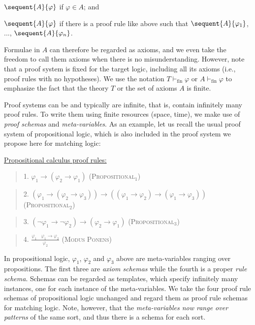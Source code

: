 \documentclass[UTF8,11pt]{article}
\theoremstyle{plain}
\theoremstyle{definition}
\theoremstyle{remark}
\newcommand{\vdashfin}{\vdash_\text{fin}}
\newcommand{\ra}{\rightarrow}
\begin{document}
$\sequent{A}{\varphi}$ if $\varphi \in A$; and

$\sequent{A}{\varphi}$ if there is a proof rule like above such that
$\sequent{A}{\varphi_1}$, ..., $\sequent{A}{\varphi_n}$.

\noindent
Formulae in $A$ can therefore be regarded as axioms, and we even take the
freedom to call them axioms when there is no misunderstanding.
However, note that a proof system is fixed for the target logic, including
all its axioms (i.e., proof rules with no hypotheses).
We use the notation $T \vdashfin \varphi$ or $A \vdashfin \varphi$ to
emphasize the fact that the theory $T$ or the set of axioms $A$ is finite.

Proof systems can be and typically are infinite, that is, contain infinitely
many proof rules.
To write them using finite resources (space, time), we make use of \emph{proof schemas}
and \emph{meta-variables}.
As an example, let us recall the usual proof system of propositional logic,
which is also included in the proof system we propose here for matching logic:

\vspace*{2ex}

\noindent
\underline{Propositional calculus proof rules:}

\begin{quote}
1. $\varphi_1 \ra (\varphi_2 \ra \varphi_1)$
\hfill \textsc{(Propositional$_1$)}
\end{quote}

\begin{quote}
2. $(\varphi_1 \ra (\varphi_2 \ra \varphi_3)) \ra ((\varphi_1 \ra \varphi_2) \ra (\varphi_1 \ra \varphi_3))$
\hfill \textsc{(Propositional$_2$)}
\end{quote}

\begin{quote}
3. $(\neg \varphi_1 \ra \neg\varphi_2) \ra (\varphi_2 \ra \varphi_1)$
\hfill \textsc{(Propositional$_3$)}
\end{quote}

\begin{quote}
4. $\displaystyle\frac{\varphi_1 \ \ \ \ \varphi_1 \ra \varphi_2}{\varphi_2}$
\hfill \textsc{(Modus Ponens)}
\end{quote}

In propositional logic, $\varphi_1$, $\varphi_2$ and $\varphi_3$ above are
meta-variables ranging over propositions.
The first three are \emph{axiom schemas} while the fourth is a proper
\emph{rule schema}.
Schemas can be regarded as templates, which specify infinitely many instances,
one for each instance of the meta-variables.
We take the four proof rule schemas of propositional logic unchanged and
regard them as proof rule schemas for matching logic.
Note, however, that the \emph{meta-variables now range over patterns} of
the same sort, and thus there is a schema for each sort.
\end{document}
